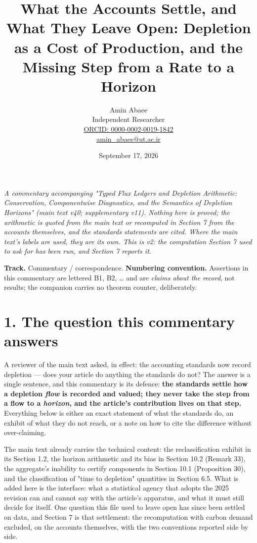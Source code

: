 \documentclass[11pt]{article}
\begin{document}
\title{What the Accounts Settle, and What They Leave Open: Depletion as a Cost of Production, and the Missing Step from a Rate to a Horizon}
\author{Amin Abaee\\[0.35em]
{\small Independent Researcher}\\[0.55em]
{\small\href{https://orcid.org/0000-0002-0019-1842}{ORCID: 0000-0002-0019-1842}}\\[0.3em]
{\small\href{mailto:amin\_abaee@ut.ac.ir}{amin\_abaee@ut.ac.ir}}}
\date{September 17, 2026}
\maketitle

\emph{A commentary accompanying "Typed Flux Ledgers and Depletion Arithmetic: Conservation, Componentwise Diagnostics, and the Semantics of Depletion Horizons" (main text v40; supplementary v11). Nothing here is proved; the arithmetic is quoted from the main text or recomputed in Section 7 from the accounts themselves, and the standards statements are cited. Where the main text's labels are used, they are its own. This is v2: the computation Section 7 used to ask for has been run, and Section 7 reports it.}

\textbf{Track.} Commentary / correspondence. \textbf{Numbering convention.} Assertions in this commentary are lettered B1, B2, \ldots{} and are \emph{claims about the record}, not results; the companion carries no theorem counter, deliberately.

\vspace{0.8em}

\section*{1. The question this commentary answers}\label{1-the-question-this-commentary-answers}

A reviewer of the main text asked, in effect: the accounting standards now record depletion --- does your article do anything the standards do not? The answer is a single sentence, and this commentary is its defence: \textbf{the standards settle how a depletion \emph{flow} is recorded and valued; they never take the step from a flow to a \emph{horizon}, and the article's contribution lives on that step.} Everything below is either an exact statement of what the standards do, an exhibit of what they do not reach, or a note on how to cite the difference without over-claiming.

The main text already carries the technical content: the reclassification exhibit in its Section 1.2, the horizon arithmetic and its bias in Section 10.2 (Remark 33), the aggregate's inability to certify components in Section 10.1 (Proposition 30), and the classification of "time to depletion" quantities in Section 6.5. What is added here is the interface: what a statistical agency that adopts the 2025 revision can and cannot say with the article's apparatus, and what it must still decide for itself. One question this file used to leave open has since been settled on data, and Section 7 is that settlement: the recomputation with carbon demand excluded, on the accounts themselves, with the two conventions reported side by side.
\end{document}
